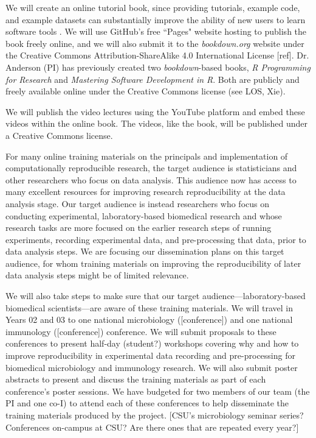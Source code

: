 \documentclass[pdftex,english,11pt,parskip=half]{scrartcl}
\begin{document}
We will create an online tutorial book, since providing tutorials, example code, and example datasets can substantially improve the ability of new users to learn software tools \cite{list2017ten}. We will use GitHub's free ``Pages" website hosting to publish the book freely online, and we will also submit it to the \textit{bookdown.org} website under the Creative Commons Attribution-ShareAlike 4.0 International License [ref]. Dr. Anderson (PI) has previously created two \textit{bookdown}-based books, \textit{R Programming for Research} and \textit{Mastering Software Development in R}. Both are publicly and freely available online under the Creative Commons license (see LOS, Xie). 

We will publish the video lectures using the YouTube platform and embed these videos within the online book. The videos, like the book, will be published under a Creative Commons license.

For many online training materials on the principals and implementation of computationally reproducible research, the target audience is statisticians and other researchers who focus on data analysis. This audience now has access to many excellent resources for improving research reproducibility at the data analysis stage. Our target audience is instead researchers who focus on conducting experimental, laboratory-based biomedical research and whose research tasks are more focused on the earlier research steps of running experiments, recording experimental data, and pre-processing that data, prior to data analysis steps. We are focusing our dissemination plans on this target audience, for whom training materials on improving the reproducibility of later data analysis steps might be of limited relevance.

We will also take steps to make sure that our target audience---laboratory-based biomedical scientists---are aware of these training materials. We will travel in Years 02 and 03 to one national microbiology ([conference]) and one national immunology ([conference]) conference. We will submit proposals to these conferences to present half-day (student?) workshops covering why and how to improve reproducibility in experimental data recording and pre-processing for biomedical microbiology and immunology research. We will also submit poster abstracts to present and discuss the training materials as part of each conference's poster sessions. We have budgeted for two members of our team (the PI and one co-I) to attend each of these conferences to help disseminate the training materials produced by the project. [CSU's microbiology seminar series? Conferences on-campus at CSU? Are there ones that are repeated every year?]
\end{document}
